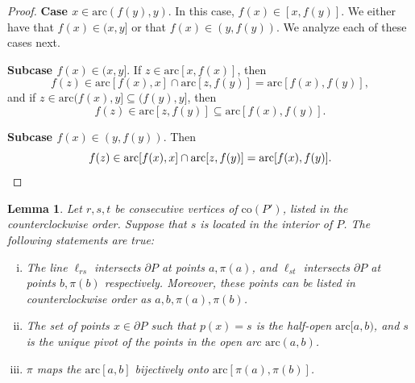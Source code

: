 \documentclass[11pt]{amsart}
\newtheorem{lemma}[theorem]{Lemma}
\theoremstyle{remark}
\numberwithin{equation}{section}
\newcommand{\co}{\mathrm{co}}
\newcommand{\arc}{\mathrm{arc}}
\begin{document}
\begin{proof}
\textbf{Case $x\in \arc(f(y),y)$}. 
In this case, $f(x)\in [x,f(y)]$. We  either have that $f(x)\in (x,y]$ or that $f(x)\in (y,f(y))$. We analyze each of these cases next.

\textbf{Subcase $f(x)\in (x,y]$}. If $z\in \arc[x,f(x)]$, then
\[
f(z)\in \arc[f(x),x]\cap \arc[z,f(y)]=\arc[f(x),f(y)],
\] 
and if $z\in \arc (f(x),y]\subseteq (f(y),y]$, then 
\[
f(z)\in \arc[z,f(y)]\subseteq \arc[f(x),f(y)].
\]


\textbf{Subcase $f(x)\in (y,f(y))$}. Then
\[
f(z)\in \arc[f(x),x]\cap \arc[z,f(y)]=\arc[f(x),f(y)].\qedhere
\]
\end{proof}

 



\begin{lemma}\label{rst}
Let $r,s,t$ be consecutive vertices of $\co(P')$, listed in the counterclockwise order. Suppose that $s$ is located in the interior of $P$. The following statements are true:

\begin{enumerate}[(i)]
\item
The line $\ell_{rs}$ intersects $\partial P$ at points $a,\pi(a)$, and $\ell_{st}$ intersects $\partial P$ at points $b,\pi(b)$ respectively. Moreover, these points can be listed in counterclockwise order as $a,b,\pi(a),\pi(b)$.

\item
The set of points $x\in\partial P$ such that $p(x)=s$ is the half-open $\arc[a,b)$, and $s$ is the unique pivot of the points in the open arc $\arc(a,b)$. 

\item
$\pi$ maps the  $\arc[a,b]$ bijectively onto  $\arc[\pi(a),\pi(b)]$.

\end{enumerate}
\end{lemma}
\end{document}
